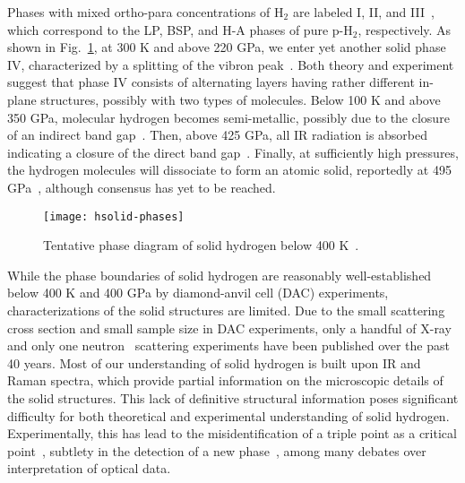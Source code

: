 
Phases with mixed ortho-para concentrations of H$_2$ are labeled I, II, and III~\cite{Dias2016,Dias2019}, which correspond to the LP, BSP, and H-A phases of pure p-H$_2$, respectively.
As shown in Fig.~\ref{fig:hsolid-phases}, at 300 K and above 220 GPa, we enter yet another solid phase IV, characterized by a splitting of the vibron peak~\cite{Zha2013}.
Both theory and experiment suggest that phase IV consists of alternating layers having rather different in-plane structures, possibly with two types of molecules.
Below 100 K and above 350 GPa, molecular hydrogen becomes semi-metallic, possibly due to the closure of an indirect band gap~\cite{Eremets2019}.
Then, above 425 GPa, all IR radiation is absorbed indicating a closure of the direct band gap~\cite{Loubeyre2020}.
Finally, at sufficiently high pressures, the hydrogen molecules will dissociate to form an atomic solid, reportedly at 495 GPa~\cite{Silvera2017}, although consensus has yet to be reached.

\begin{figure}[h]
\centering
\texttt{[image: hsolid-phases]}
\caption{Tentative phase diagram of solid hydrogen below 400 K~\cite{Dias2019}.}
\label{fig:hsolid-phases}
\end{figure}

While the phase boundaries of solid hydrogen are reasonably well-established below 400 K and 400 GPa by diamond-anvil cell (DAC) experiments, characterizations of the solid structures are limited. Due to the small scattering cross section and small sample size in DAC experiments, only a handful of X-ray~\cite{Hazen1987,MAO1988,Loubeyre1996,Kawamura2002,Goncharenko2005a,Akahama2010,Ji2019} and only one neutron~\cite{Goncharenko2005a} scattering experiments have been published over the past 40 years. Most of our understanding of solid hydrogen is built upon IR and Raman spectra, which provide partial information on the microscopic details of the solid structures. This lack of definitive structural information poses significant difficulty for both theoretical and experimental understanding of solid hydrogen. Experimentally, this has lead to the misidentification of a triple point as a critical point~\cite{Lorenzana1990,Cui1994}, subtlety in the detection of a new phase~\cite{Eremets2009,Howie2012}, among many debates over interpretation of optical data.

